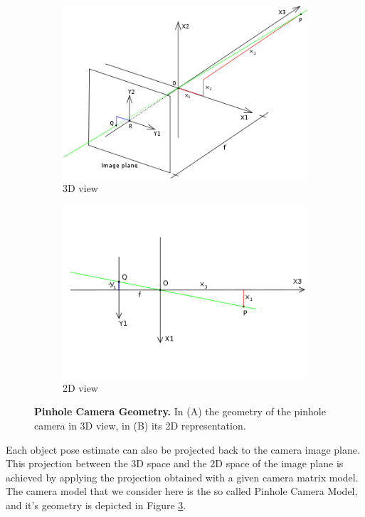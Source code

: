 \begin{figure}
	\centering
	\begin{subfigure}{.5\textwidth}
  		\centering
  		\includegraphics[width=.9\linewidth]{figures/2_benchmarks_and_metrics/pinhole_geometry_3D}
  		\caption{3D view}
  		\label{fig:pinhole_geometry3D}
	\end{subfigure}%
	\begin{subfigure}{.5\textwidth}
  		\centering
  		\includegraphics[width=.9\linewidth]{figures/2_benchmarks_and_metrics/pinhole_geometry_2D}
  		\caption{2D view}
  		\label{fig:pinhole_geometry2D}
	\end{subfigure}
	\caption{\textbf{Pinhole Camera Geometry.} In (A) the geometry of the pinhole camera in 3D view, in (B) its 2D representation.}
	\label{fig:pinhole_geometry}
\end{figure}

Each object pose estimate can also be projected back to the camera image plane. This projection between the 3D space and the 2D space of the image plane is achieved by applying the projection obtained with a given camera matrix model. The camera model that we consider here is the so called Pinhole Camera Model, and it's geometry is depicted in Figure \ref{fig:pinhole_geometry}.

